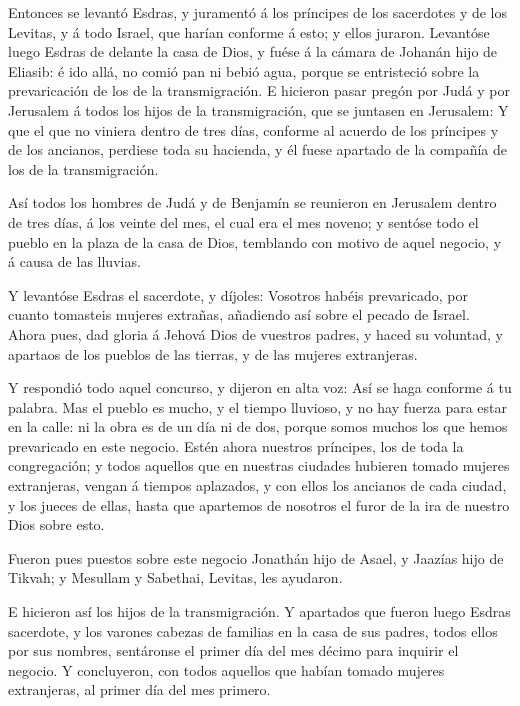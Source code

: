  Entonces se levantó Esdras, y juramentó á los príncipes de
los sacerdotes y de los Levitas, y á todo Israel, que harían conforme á
esto; y ellos juraron.  Levantóse luego Esdras de delante la
casa de Dios, y fuése á la cámara de Johanán hijo de Eliasib: é ido
allá, no comió pan ni bebió agua, porque se entristeció sobre la
prevaricación de los de la transmigración.  E hicieron pasar
pregón por Judá y por Jerusalem á todos los hijos de la transmigración,
que se juntasen en Jerusalem:  Y que el que no viniera
dentro de tres días, conforme al acuerdo de los príncipes y de los
ancianos, perdiese toda su hacienda, y él fuese apartado de la compañía
de los de la transmigración.

 Así todos los hombres de Judá y de Benjamín se reunieron en
Jerusalem dentro de tres días, á los veinte del mes, el cual era el mes
noveno; y sentóse todo el pueblo en la plaza de la casa de Dios,
temblando con motivo de aquel negocio, y á causa de las lluvias.

 Y levantóse Esdras el sacerdote, y díjoles: Vosotros
habéis prevaricado, por cuanto tomasteis mujeres extrañas, añadiendo así
sobre el pecado de Israel.  Ahora pues, dad gloria á Jehová
Dios de vuestros padres, y haced su voluntad, y apartaos de los pueblos
de las tierras, y de las mujeres extranjeras.

 Y respondió todo aquel concurso, y dijeron en alta voz:
Así se haga conforme á tu palabra.  Mas el pueblo es mucho,
y el tiempo lluvioso, y no hay fuerza para estar en la calle: ni la obra
es de un día ni de dos, porque somos muchos los que hemos prevaricado en
este negocio.  Estén ahora nuestros príncipes, los de toda
la congregación; y todos aquellos que en nuestras ciudades hubieren
tomado mujeres extranjeras, vengan á tiempos aplazados, y con ellos los
ancianos de cada ciudad, y los jueces de ellas, hasta que apartemos de
nosotros el furor de la ira de nuestro Dios sobre esto.

 Fueron pues puestos sobre este negocio Jonathán hijo de
Asael, y Jaazías hijo de Tikvah; y Mesullam y Sabethai, Levitas, les
ayudaron.

 E hicieron así los hijos de la transmigración. Y apartados
que fueron luego Esdras sacerdote, y los varones cabezas de familias en
la casa de sus padres, todos ellos por sus nombres, sentáronse el primer
día del mes décimo para inquirir el negocio.  Y
concluyeron, con todos aquellos que habían tomado mujeres extranjeras,
al primer día del mes primero.

